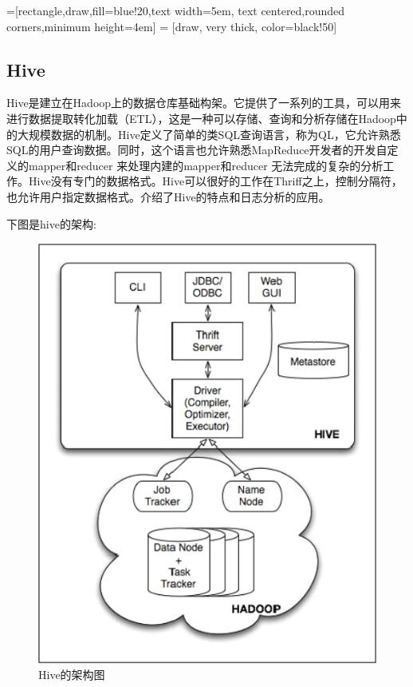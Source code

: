 =[rectangle,draw,fill=blue!20,text width=5em,
text centered,rounded corners,minimum height=4em]
 = [draw, very thick, color=black!50]


\subsection{Hive}
  Hive是建立在Hadoop上的数据仓库基础构架。它提供了一系列的工具，可以用来进行数据提取转化加载（ETL），这是一种可以存储、查询和分析存储在Hadoop中的大规模数据的机制。Hive定义了简单的类SQL查询语言，称为QL，它允许熟悉SQL的用户查询数据。同时，这个语言也允许熟悉MapReduce开发者的开发自定义的mapper和reducer 来处理内建的mapper和reducer 无法完成的复杂的分析工作。Hive没有专门的数据格式。Hive可以很好的工作在Thriff之上，控制分隔符，也允许用户指定数据格式。\cite{dataprocess}\cite{webfenxi}介绍了Hive的特点和日志分析的应用。


  下图是hive的架构: 


\begin{figure}[!ht]
\centering
\includegraphics[scale=0.6]{photo/hive.PNG} 
\caption{Hive的架构图}
\end{figure} 


